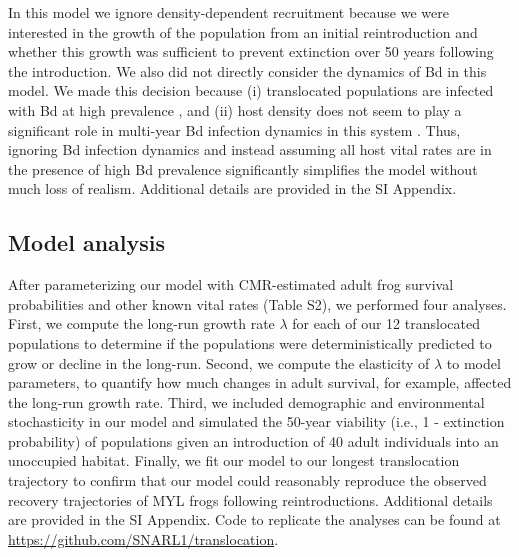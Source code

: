 \documentclass[9pt,twocolumn,twoside,lineno]{pnas-new}
\begin{document}
{In this model we ignore density-dependent recruitment because we were
interested in the growth of the population from an initial
reintroduction and whether this growth was sufficient to prevent
extinction over 50 years following the introduction. We also did not
directly consider the dynamics of Bd in this model. We made this
decision because (i) translocated populations are infected with Bd at
high prevalence \citep{joseph2018}, and (ii) host density does not seem
to play a significant role in multi-year Bd infection dynamics in this
system \citep{wilber2022}. Thus, ignoring Bd infection dynamics and
instead assuming all host vital rates are in the presence of high Bd
prevalence significantly simplifies the model without much loss of
realism. Additional details are provided in the SI Appendix.

\hypertarget{model-analysis}{%
\subsection*{Model analysis}\label{model-analysis}}

After parameterizing our model with CMR-estimated adult frog survival
probabilities and other known vital rates
(Table S2), we performed four analyses. First, we
compute the long-run growth rate \(\lambda\) for each of our 12
translocated populations to determine if the populations were
deterministically predicted to grow or decline in the long-run. Second,
we compute the elasticity of \(\lambda\) to model parameters, to
quantify how much changes in adult survival, for example, affected the
long-run growth rate. Third, we included demographic and environmental
stochasticity in our model and simulated the 50-year viability (i.e., 1
- extinction probability) of populations given an introduction of 40
adult individuals into an unoccupied habitat. Finally, we fit our model
to our longest translocation trajectory to confirm that our model could
reasonably reproduce the observed recovery trajectories of MYL frogs
following reintroductions. Additional details are provided in the SI
Appendix. Code to replicate the analyses can be found at
\url{https://github.com/SNARL1/translocation}.

}


\showmatmethods{} %

\end{document}
